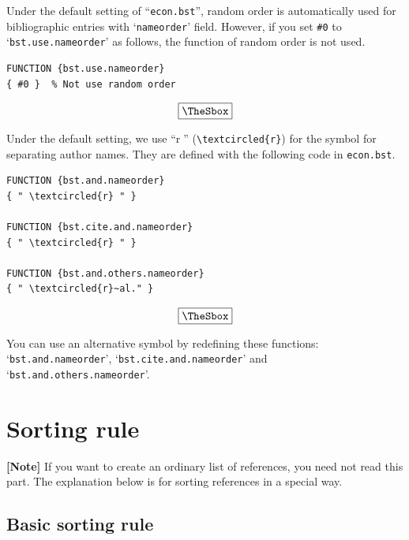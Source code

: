 \documentclass[10pt]{article}
\newenvironment{Frame}%
{\setlength{\fboxsep}{15pt}
\setlength{\mylength}{\linewidth}%
\addtolength{\mylength}{-2\fboxsep}%
\addtolength{\mylength}{-2\fboxrule}%
\Sbox
\minipage{\mylength}%
\setlength{\abovedisplayskip}{0pt}%
\setlength{\belowdisplayskip}{0pt}%
}%
{\endminipage\endSbox
\[\fbox{\TheSbox}\]}
\begin{document}
Under the default setting of ``\texttt{econ.bst}'', random order is
automatically used for bibliographic entries with `\texttt{nameorder}' field.
However, if you set \verb|#0| to `\texttt{bst.use.nameorder}' as follows, the
function of random order is not used.
\begin{Frame}
\begin{verbatim}
FUNCTION {bst.use.nameorder}
{ #0 }  % Not use random order
\end{verbatim}
\end{Frame}

Under the default setting, we use ``\textcircled{r}'' (\verb|\textcircled{r}|)
for the symbol for separating author names.
They are defined with the following code in \texttt{econ.bst}.
\begin{Frame}
\begin{verbatim}
FUNCTION {bst.and.nameorder}
{ " \textcircled{r} " }

FUNCTION {bst.cite.and.nameorder}
{ " \textcircled{r} " }

FUNCTION {bst.and.others.nameorder}
{ " \textcircled{r}~al." }
\end{verbatim}
\end{Frame}

You can use an alternative symbol by redefining these functions:
`\texttt{bst.and.nameorder}', `\texttt{bst.cite.and.nameorder}' and
`\texttt{bst.and.others.nameorder}'.


\section{Sorting rule}
\label{sec:sort_rule}

\noindent \textbf{[Note]} If you want to create an ordinary list of
references, you need not  read this part.  The explanation below is
for sorting references in a special way.

\subsection{Basic sorting rule}
\end{document}
